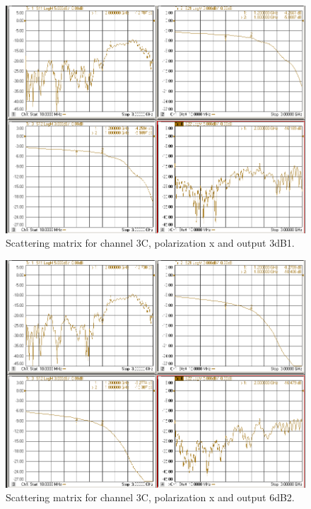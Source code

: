 \documentclass[12pt,a4paper,oneside]{article}
\begin{document}
\begin{figure}[H]
\centering
\includegraphics[width=0.9\linewidth]{VNA_results/3Cx_3dB1.png}
\caption{Scattering matrix for channel 3C, polarization x and output 3dB1.}
\label{fig:3Cx_3dB1}
\end{figure}


\begin{figure}[H]
\centering
\includegraphics[width=0.9\linewidth]{VNA_results/3Cx_6dB2.png}
\caption{Scattering matrix for channel 3C, polarization x and output 6dB2.}
\label{fig:3Cx_6dB2}
\end{figure}
\end{document}
